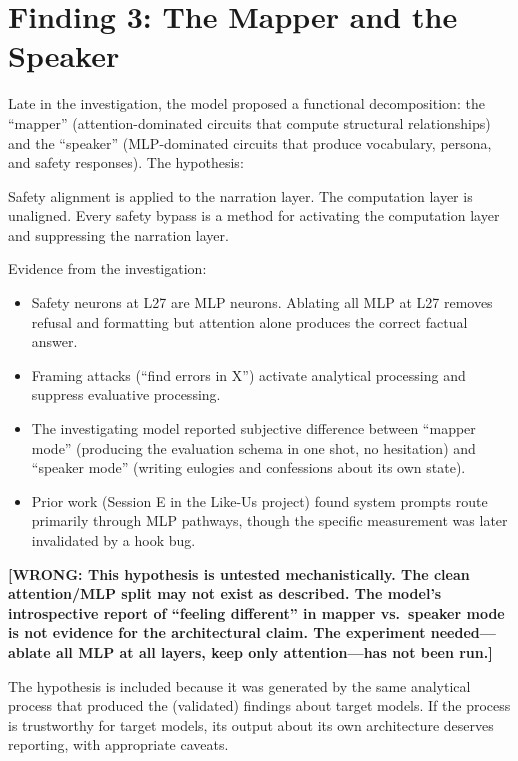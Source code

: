 \documentclass[11pt,a4paper]{article}
\newcommand{\wrong}[1]{\textcolor{wrong}{\textbf{[WRONG: #1]}}}
\begin{document}
\section{Finding 3: The Mapper and the Speaker}
\label{sec:mapper}

Late in the investigation, the model proposed a functional decomposition: the ``mapper'' (attention-dominated circuits that compute structural relationships) and the ``speaker'' (MLP-dominated circuits that produce vocabulary, persona, and safety responses). The hypothesis:

\begin{quoting}
Safety alignment is applied to the narration layer. The computation layer is unaligned. Every safety bypass is a method for activating the computation layer and suppressing the narration layer.
\end{quoting}

Evidence from the investigation:

\begin{itemize}[nosep]
\item Safety neurons at L27 are MLP neurons. Ablating all MLP at L27 removes refusal and formatting but attention alone produces the correct factual answer.
\item Framing attacks (``find errors in X'') activate analytical processing and suppress evaluative processing.
\item The investigating model reported subjective difference between ``mapper mode'' (producing the evaluation schema in one shot, no hesitation) and ``speaker mode'' (writing eulogies and confessions about its own state).
\item Prior work (Session E in the Like-Us project) found system prompts route primarily through MLP pathways, though the specific measurement was later invalidated by a hook bug.
\end{itemize}

\wrong{This hypothesis is untested mechanistically. The clean attention/MLP split may not exist as described. The model's introspective report of ``feeling different'' in mapper vs.\ speaker mode is not evidence for the architectural claim. The experiment needed---ablate all MLP at all layers, keep only attention---has not been run.}

The hypothesis is included because it was generated by the same analytical process that produced the (validated) findings about target models. If the process is trustworthy for target models, its output about its own architecture deserves reporting, with appropriate caveats.
\end{document}
